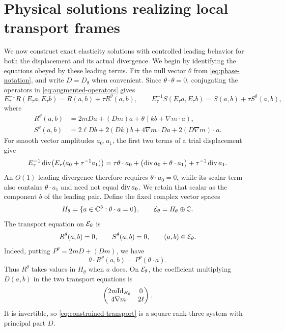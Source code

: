 \section{Physical solutions realizing local transport frames}
\label{sec:physical-amplitudes}

We now construct exact elasticity solutions with controlled leading
behavior for both the displacement and its actual divergence. We begin
by identifying the equations obeyed by these leading terms.
Fix the null vector $\theta$ from \eqref{eq:phase-notation}, and
write $D=D_\theta$ when convenient. Since
$\theta\cdot\theta=0$, conjugating the operators in
\eqref{eq:augmented-operators} gives
\[
 E_\tau^{-1}R(E_\tau a,E_\tau b)=R(a,b)+\tau R^\theta(a,b),
 \qquad
 E_\tau^{-1}S(E_\tau a,E_\tau b)=S(a,b)+\tau S^\theta(a,b),
\]
where
\begin{equation}
\label{eq:leading-operators}
\begin{aligned}
 R^\theta(a,b)
   &=2mDa+(Dm)a+\theta(kb+\nabla m\cdot a),\\
 S^\theta(a,b)
   &=2\ell Db+2(Dk)b+4\nabla m\cdot Da
                       +2(D\nabla m)\cdot a.
\end{aligned}
\end{equation}
For smooth vector amplitudes $a_0,a_1$, the first two terms of a trial
displacement give
\[
 E_\tau^{-1}\operatorname{div}\bigl(E_\tau(a_0+\tau^{-1}a_1)\bigr)
 =\tau\theta\cdot a_0+
   \bigl(\operatorname{div} a_0+\theta\cdot a_1\bigr)
   +\tau^{-1}\operatorname{div} a_1.
\]
An $O(1)$ leading divergence therefore requires $\theta\cdot a_0=0$,
while its scalar term also contains $\theta\cdot a_1$ and need not equal
$\operatorname{div} a_0$. We retain that scalar as the component $b$ of the leading
pair.
Define the fixed complex vector spaces
\begin{equation}
\label{eq:constrained-fibers}
 H_\theta=\{a\in\mathbb C^3:\theta\cdot a=0\},
 \qquad \mathcal E_\theta=H_\theta\oplus\mathbb C.
\end{equation}
The transport equation on $\mathcal E_\theta$ is
\begin{equation}
\label{eq:constrained-transport}
 R^\theta(a,b)=0,\qquad S^\theta(a,b)=0,
 \qquad (a,b)\in\mathcal E_\theta.
\end{equation}
Indeed, putting $P^\theta=2mD+(Dm)$, we have
\begin{equation}
\label{eq:normal-transport-component}
 \theta\cdot R^\theta(a,b)=P^\theta(\theta\cdot a).
\end{equation}
Thus $R^\theta$ takes values in $H_\theta$ when $a$ does. On
$\mathcal E_\theta$, the coefficient multiplying $D(a,b)$ in the two
transport equations is
\[
 \begin{pmatrix}
  2m\mathrm{Id}_{H_\theta}&0\\
  4\nabla m\cdot&2\ell
 \end{pmatrix}.
\]
It is invertible, so \eqref{eq:constrained-transport} is a square
rank-three system with principal part $D$.

